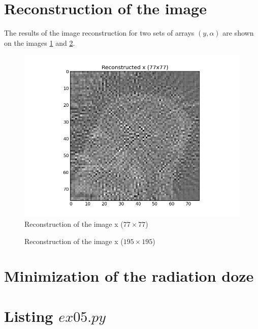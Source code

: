 \documentclass{article}
\begin{document}
\section{Reconstruction of the image}

The results of the image reconstruction for two sets of arrays $(y,\alpha)$ are shown on the images \ref{img2} and \ref{img3}.

\begin{figure}[ht]
        \centering
        \includegraphics[width=\textwidth]{../x_77.png}
        \caption{Reconstruction of the image x ($77\times77$)}
        \label{img2}
\end{figure}
\FloatBarrier

\begin{figure}[ht]
        \centering
        \caption{Reconstruction of the image x ($195\times195$)}
        \label{img3}
\end{figure}
\FloatBarrier


\section{Minimization of the radiation doze}

\section{Listing $ex05.py$}

\end{document}
